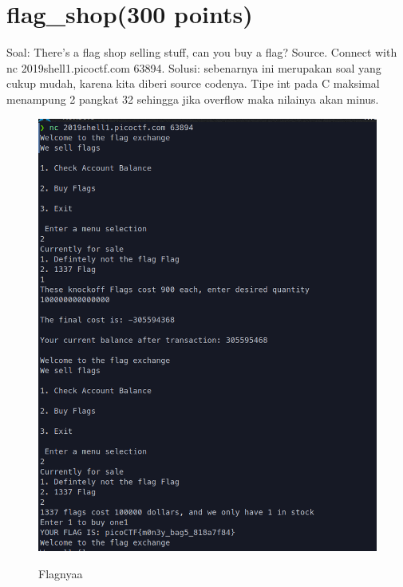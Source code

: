 \documentclass[a4paper,12pt]{article}
\begin{document}
\section{\textbf{flag\_shop(300 points)}}
Soal: There's a flag shop selling stuff, can you buy a flag? Source. Connect with nc 2019shell1.picoctf.com 63894.
Solusi: sebenarnya ini merupakan soal yang cukup mudah, karena kita diberi source codenya. Tipe int pada C maksimal menampung 2 pangkat 32 sehingga jika overflow maka nilainya akan minus.
\begin{figure}[H]
 \centering
\includegraphics[width=1\textwidth]{flagshopflag.png}\\
\caption{Flagnyaa}
\end{figure}
\end{document}

